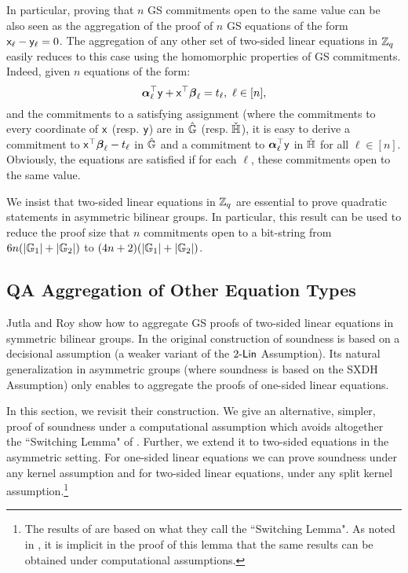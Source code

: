 In particular, proving that $n$ GS commitments open to the same value can be also seen as the aggregation of the proof  of $n$ GS equations of the form $\mathsf{x}_\ell -\mathsf{y}_\ell=0$. The aggregation of any other set of two-sided linear equations in $\mathbb{Z}_q$
easily reduces to this case using the homomorphic properties of GS commitments. Indeed, given $n$ equations of the form:
 $$  {\boldsymbol \alpha}_{\ell}^{\top} \mathbf{\mathsf{y}}+ \mathbf{\mathsf{x}}^{\top}\boldsymbol \beta_{\ell} =t_\ell, \ \ell \in [n],$$
 and the commitments to a satisfying assignment (where the commitments to every coordinate of $\mathbf{\mathsf{x}}$ (resp. $\mathbf{\mathsf{y}}$) are in ${\hat{\mathbb{G}}}$ (resp. ${\check{\mathbb{H}}}$), it is easy to derive a commitment to $\mathbf{\mathsf{x}}^{\top} {\boldsymbol \beta}_{\ell}- t_{\ell}$ in ${\hat{\mathbb{G}}}$ and a commitment to  ${\boldsymbol \alpha}_{\ell}^{\top} \mathbf{\mathsf{y}}$ in ${\check{\mathbb{H}}}$ for all $\ell \in [n]$. Obviously, the equations are satisfied if for each $\ell$, these commitments open to the same value. 

We insist that two-sided linear equations in $\mathbb{Z}_q$ are essential to prove quadratic statements in asymmetric bilinear groups. In particular, this result can be used to reduce the proof size that $n$ commitments open to a bit-string from $6n(|\mathbb{G}_1|+|\mathbb{G}_2|)$ to $(4n+2)(|\mathbb{G}_1|+|\mathbb{G}_2|)$.

\subsection{QA Aggregation of Other Equation Types} \label{sec:jutroyaggasym}
Jutla and Roy \cite{C:JutRoy14} show how to aggregate GS proofs of 
two-sided linear equations in symmetric bilinear groups. In the original construction of \cite{C:JutRoy14} soundness is based on a decisional assumption (a weaker variant of the $2\mbox{-}\mathsf{Lin}$ Assumption). Its natural generalization in asymmetric groups (where soundness is based on the SXDH Assumption) only enables to aggregate the proofs of one-sided linear equations. 

In this section, we revisit their construction. We give an alternative, simpler, proof of soundness under a computational assumption which avoids altogether the ``Switching Lemma" of \cite{C:JutRoy14}. Further, we extend it to two-sided equations in the asymmetric setting. For one-sided linear equations we can prove soundness under any kernel assumption and for two-sided linear equations, under any split kernel assumption.\footnote{The results of  \cite{C:JutRoy14} are based on what they call  the ``Switching Lemma". As noted in \cite{EPRINT:MorRafVil15}, it is implicit in the proof of this lemma that the same results can be obtained under computational assumptions.}

